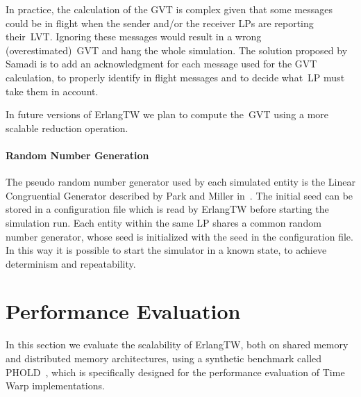 \documentclass{sigplanconf}
\begin{document}
In practice, the calculation of the GVT is complex given that 
some messages could be in flight when the sender and/or the receiver 
LPs are reporting their~\ac{LVT}. Ignoring these messages would 
result in a wrong (overestimated)~\ac{GVT} and hang the whole simulation.
The solution proposed by Samadi is to add an acknowledgment for each 
message used for the GVT calculation, to properly identify in flight 
messages and to decide what~\ac{LP} must take them in account.

In future versions of ErlangTW we plan to compute the~\ac{GVT} using a 
more scalable reduction operation.

\paragraph*{Random Number Generation}
The pseudo random number generator used by each simulated entity is
the Linear Congruential Generator described by Park and Miller
in~\cite{PM88}.  The initial seed can be stored in a configuration
file which is read by ErlangTW before starting the simulation
run. Each entity within the same \ac{LP} shares a common random number
generator, whose seed is initialized with the seed in the
configuration file. In this way it is possible to start the simulator
in a known state, to achieve determinism and repeatability.

\section{Performance Evaluation}\label{sec:performance_evaluation}

In this section we evaluate the scalability of ErlangTW, both on
shared memory and distributed memory architectures, using a synthetic
benchmark called PHOLD~\cite{Fuj90}, which is specifically designed
for the performance evaluation of Time Warp implementations.
\end{document}

